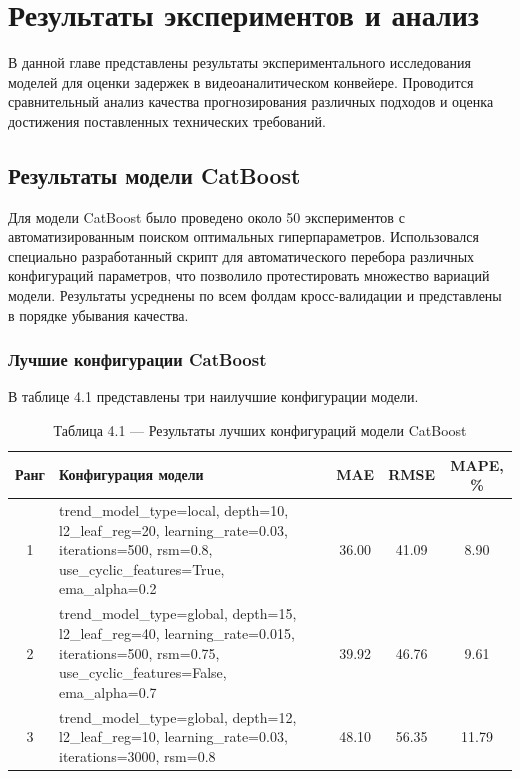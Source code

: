 \chapter{Результаты экспериментов и анализ}
\label{ch:results}

\hspace*{1.25cm}В данной главе представлены результаты экспериментального исследования моделей для оценки задержек в видеоаналитическом конвейере. Проводится сравнительный анализ качества прогнозирования различных подходов и оценка достижения поставленных технических требований.

\section{Результаты модели CatBoost}
\label{sec:catboost_results}

\hspace*{1.25cm}Для модели CatBoost было проведено около 50 экспериментов с автоматизированным поиском оптимальных гиперпараметров. Использовался специально разработанный скрипт для автоматического перебора различных конфигураций параметров, что позволило протестировать множество вариаций модели. Результаты усреднены по всем фолдам кросс-валидации и представлены в порядке убывания качества.

\subsection{Лучшие конфигурации CatBoost}

\hspace*{1.25cm}В таблице 4.1 представлены три наилучшие конфигурации модели.

\begin{table}[H]
	\centering
	\caption*{Таблица 4.1 --- Результаты лучших конфигураций модели CatBoost}
	\begin{tabular}{|c|p{8cm}|c|c|c|}
		\hline
		\textbf{Ранг} & \textbf{Конфигурация модели} & \textbf{MAE} & \textbf{RMSE} & \textbf{MAPE, \%} \\
		\hline
		1 & trend\_model\_type=local, depth=10, l2\_leaf\_reg=20, learning\_rate=0.03, iterations=500, rsm=0.8, use\_cyclic\_features=True, ema\_alpha=0.2 & 36.00 & 41.09 & 8.90 \\
		\hline
		2 & trend\_model\_type=global, depth=15, l2\_leaf\_reg=40, learning\_rate=0.015, iterations=500, rsm=0.75, use\_cyclic\_features=False, ema\_alpha=0.7 & 39.92 & 46.76 & 9.61 \\
		\hline
		3 & trend\_model\_type=global, depth=12, l2\_leaf\_reg=10, learning\_rate=0.03, iterations=3000, rsm=0.8 & 48.10 & 56.35 & 11.79 \\
		\hline
	\end{tabular}
	\label{tab:catboost_results}
\end{table}

